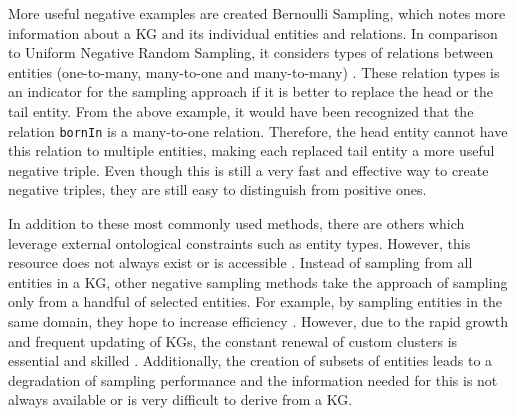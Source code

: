 More useful negative examples are created Bernoulli Sampling, which notes more information about a \ac{KG} and its individual entities and relations.
In comparison to Uniform Negative Random Sampling, it considers types of relations between entities (one-to-many, many-to-one and many-to-many) \cite{zhang2021efficient}.
These relation types is an indicator for the sampling approach if it is better to replace the head or the tail entity.
From the above example, it would have been recognized that the relation \texttt{bornIn} is a many-to-one relation.
Therefore, the head entity cannot have this relation to multiple entities, making each replaced tail entity a more useful negative triple.
Even though this is still a very fast and effective way to create negative triples, they are still easy to distinguish from positive ones.

In addition to these most commonly used methods, there are others which leverage external ontological constraints such as entity types.
However, this resource does not always exist or is accessible \cite{cai2017kbgan}.
Instead of sampling from all entities in a \ac{KG}, other negative sampling methods take the approach of sampling only from a handful of selected entities.
For example, by sampling entities in the same domain, they hope to increase efficiency \cite{qiannegative}.
However, due to the rapid growth and frequent updating of \acp{KG}, the constant renewal of custom clusters is essential and skilled \cite{qiannegative}. 
Additionally, the creation of subsets of entities leads to a degradation of sampling performance and the information needed for this is not always available or is very difficult to derive from a \ac{KG}.







 
